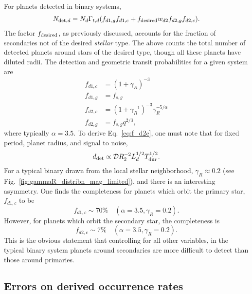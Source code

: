 \documentclass{emulateapj}
\begin{document}
For planets detected in binary systems,
\begin{equation}
N_{{\rm det},d}
= 
N_d \Gamma_{t,d} (f_{d1,g}f_{d1,c} + f_{\rm desired}w_{d2}f_{d2,g}f_{d2,c}).
\label{eq:N_det_d_model2}
\end{equation}
The factor $f_{\rm desired}$, as previously discussed, accounts for the 
fraction of secondaries not of the desired {\it stellar} type. The above 
counts the total number of detected planets around stars of the desired type, 
though all these planets have diluted radii.
The detection and geometric transit probabilities for a given system are
\begin{align}
f_{d1,c} &= (1+\gamma_R)^{-3} 
\label{eq:f_d1c}
\\
f_{d1,g} &= f_{s,g} \\
f_{d2,c} &= (1+\gamma_R^{-1})^{-3} \gamma_R^{-5/\alpha} 
\label{eq:f_d2c}\\
f_{d2,g} &= f_{s,g}q^{2/3},
\label{eq:f_d2g}
\end{align}
where typically $\alpha=3.5$.
To derive Eq.~\ref{eq:f_d2c}, one must note that for fixed period, planet 
radius, and signal to noise, 
$$d_{\rm det}\propto \mathcal{D} R_2^{-2} L_d^{1/2} T_{\rm dur}^{1/2}.$$
For a typical binary drawn from the local stellar neighborhood, $\gamma_R 
\approx 0.2$ (see Fig.~\ref{fig:gammaR_distribn_mag_limited}), and there is an 
interesting asymmetry.
One finds the completeness for planets which orbit the primary star, 
$f_{d1,c}$ to be
\begin{equation}
f_{d1,c} \sim 70\% \quad(\alpha=3.5, \gamma_R=0.2).
\end{equation}
However, for planets which orbit the secondary star, the completeness is
\begin{equation}
f_{d2,c} \sim 7\% \quad(\alpha=3.5, \gamma_R=0.2).
\end{equation}
This is the obvious statement that controlling for all other variables, 
in the typical binary system planets around secondaries are more difficult to 
detect than those around primaries.

\subsection{Errors on derived occurrence rates}
\end{document}
